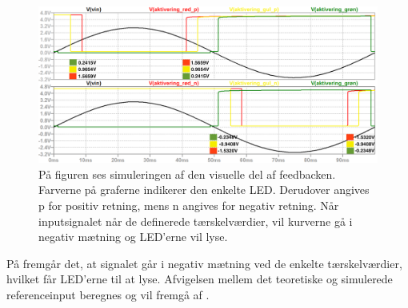 \begin{figure}[H]
	\centering
	\includegraphics[scale=0.36]{figures/cProblemloesning/komparator_visuel_simulering_samlet1.PNG}
	\caption{På figuren ses simuleringen af den visuelle del af feedbacken. Farverne på graferne indikerer den enkelte LED. Derudover angives p for positiv retning, mens n angives for negativ retning. Når inputsignalet når de definerede tærskelværdier, vil kurverne gå i negativ mætning og LED'erne vil lyse.}
	\label{fig:komparator_visuel_simulering_samlet1}
\end{figure}

\noindent På  fremgår det, at signalet går i negativ mætning ved de enkelte tærskelværdier, hvilket får LED'erne til at lyse. Afvigelsen mellem det teoretiske og simulerede referenceinput beregnes og vil fremgå af .

